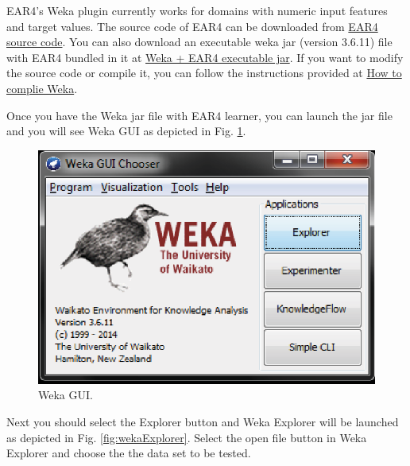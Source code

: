 \documentclass[a4paper]{article}
\begin{document}
\sloppy EAR4's Weka plugin currently works for domains with numeric input features and target values. 
The source code of EAR4 can be downloaded from
\href{https://github.com/vahidj/CBR/blob/master/src/main/java/weka/classifiers/lazy/EAR4.java}{EAR4 source code}.
You can also download an executable weka jar (version 3.6.11) file with EAR4 bundled in it at 
\href{https://github.com/vahidj/CBR/tree/master/dist/weka.jar}{Weka + EAR4 executable jar}.
If you want to modify the source code or compile it, you can follow the instructions provided at 
\href{http://weka.wikispaces.com/How+do+I+compile+WEKA\%3F}{How to complie Weka}.

Once you have the Weka jar file with EAR4 learner, you can launch the jar file and you will see Weka 
GUI as depicted in Fig. \ref{fig:wekaGUI}. 

\begin{figure}[htb]
  \begin{center}
  \includegraphics[scale=0.7]{figures/wekaGUI.eps}
  \caption{Weka GUI.}
  \label{fig:wekaGUI}
  \end{center}
\end{figure}

Next you should select the Explorer button
and Weka Explorer will be launched as depicted in Fig. \ref{fig:wekaExplorer}. Select the open file 
button in Weka Explorer and choose the the data set to be tested.
\end{document}

